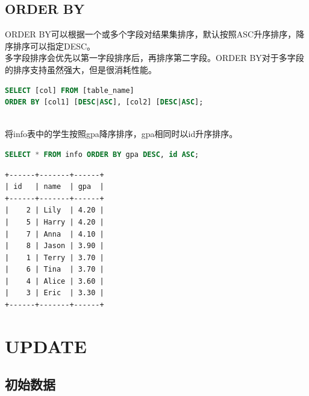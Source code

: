 \documentclass[12pt, openany, oneside]{book}
\begin{document}
\section{ORDER BY}

ORDER BY可以根据一个或多个字段对结果集排序，默认按照ASC升序排序，降序排序可以指定DESC。 \\

多字段排序会优先以第一字段排序后，再排序第二字段。ORDER BY对于多字段的排序支持虽然强大，但是很消耗性能。

\vspace{-0.5cm}

\begin{lstlisting}[language=SQL]
SELECT [col] FROM [table_name]
ORDER BY [col1] [DESC|ASC], [col2] [DESC|ASC];
\end{lstlisting}

\vspace{0.5cm}

 \\

将info表中的学生按照gpa降序排序，gpa相同时以id升序排序。

\vspace{-0.5cm}

\begin{lstlisting}[language=SQL]
SELECT * FROM info ORDER BY gpa DESC, id ASC;
\end{lstlisting}

\begin{tcolorbox}
    \begin{verbatim}
+------+-------+------+
| id   | name  | gpa  |
+------+-------+------+
|    2 | Lily  | 4.20 |
|    5 | Harry | 4.20 |
|    7 | Anna  | 4.10 |
|    8 | Jason | 3.90 |
|    1 | Terry | 3.70 |
|    6 | Tina  | 3.70 |
|    4 | Alice | 3.60 |
|    3 | Eric  | 3.30 |
+------+-------+------+
    \end{verbatim}
\end{tcolorbox}

\newpage

\chapter{UPDATE}

\section{初始数据}

\end{document}
